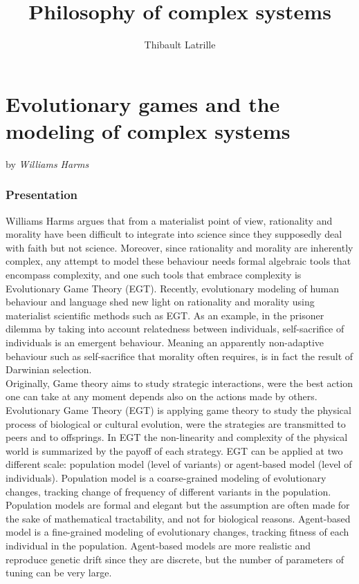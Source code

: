 \documentclass[10pt]{article}
\author{Thibault Latrille}
\title{Philosophy of complex systems}
\begin{document}
\maketitle
\part*{Evolutionary games and the modeling of complex systems}
by \textit{Williams Harms}

\section*{Presentation}
 
Williams Harms argues that from a materialist point of view, rationality and morality have been difficult to integrate into science since they supposedly deal with faith but not science. Moreover, since rationality and morality are inherently complex, any attempt to model these behaviour needs formal algebraic tools that encompass complexity, and one such tools that embrace complexity is Evolutionary Game Theory (EGT). Recently, evolutionary modeling of human behaviour and language shed new light on rationality and morality using materialist scientific methods such as EGT. As an example, in the prisoner dilemma by taking into account relatedness between individuals, self-sacrifice of individuals is an emergent behaviour. Meaning an apparently non-adaptive behaviour such as self-sacrifice that morality often requires, is in fact the result of Darwinian selection. \\


Originally, Game theory aims to study strategic interactions, were the best action one can take at any moment depends also on the actions made by others. Evolutionary Game Theory (EGT) is applying game theory to study the physical process of biological or cultural evolution, were the strategies are transmitted to peers and to offsprings. In EGT the non-linearity and complexity of the physical world is summarized by the payoff of each strategy. EGT can be applied at two different scale: population model (level of variants) or agent-based model (level of individuals). Population model is a coarse-grained modeling of evolutionary changes, tracking change of frequency of different variants in the population. Population models are formal and elegant but the assumption are often made for the sake of mathematical tractability, and not for biological reasons. Agent-based model is a fine-grained modeling of evolutionary changes, tracking fitness of each individual in the population. Agent-based models are more realistic and reproduce genetic drift since they are discrete, but the number of parameters of tuning can be very large. \\
\end{document}
